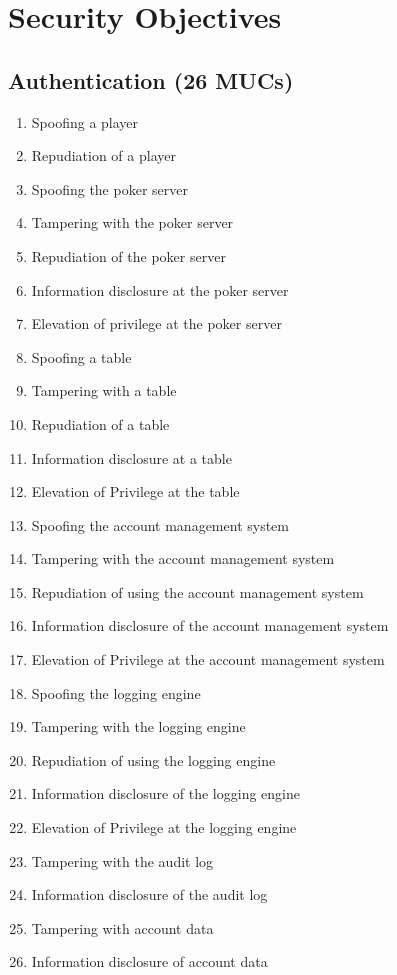 \documentclass[a4paper,11pt]{report}
\begin{document}
\section{Security Objectives}
\label{MUCLabels}

\subsection{Authentication (26 MUCs)}
\begin{enumerate}
\item Spoofing a player
\item Repudiation of a player
\item Spoofing the poker server
\item Tampering with the poker server
\item Repudiation of the poker server
\item Information disclosure at the poker server
\item Elevation of privilege at the poker server
\item Spoofing a table
\item Tampering with a table
\item Repudiation of a table
\item Information disclosure at a table
\item Elevation of Privilege at the table
\item Spoofing the account management system
\item Tampering with the account management system
\item Repudiation of using the account management system
\item Information disclosure of the account management system
\item Elevation of Privilege at the account management system
\item Spoofing the logging engine
\item Tampering with the logging engine
\item Repudiation of using the logging engine
\item Information disclosure of the logging engine
\item Elevation of Privilege at the logging engine
\item Tampering with the audit log
\item Information disclosure of the audit log
\item Tampering with account data
\item Information disclosure of account data
\end{enumerate}
\end{document}
